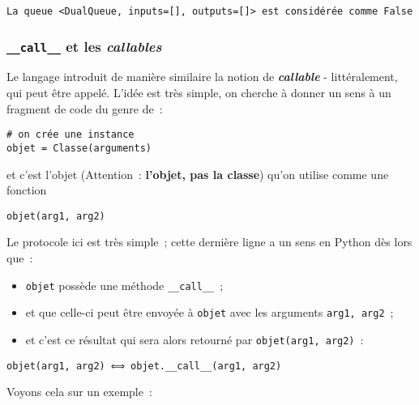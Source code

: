     \begin{Verbatim}[commandchars=\\\{\}]
La queue <DualQueue, inputs=[], outputs=[]> est considérée comme False

    \end{Verbatim}


    \hypertarget{call__-et-les-callables}{%
\subsubsection{\texorpdfstring{\texttt{\_\_call\_\_} et les
\emph{callables}}{\_\_call\_\_ et les callables}}\label{call__-et-les-callables}}

    Le langage introduit de manière similaire la notion de
\textbf{\emph{callable}} - littéralement, qui peut être appelé. L'idée
est très simple, on cherche à donner un sens à un fragment de code du
genre de~:

    \begin{verbatim}
# on crée une instance
objet = Classe(arguments)
\end{verbatim}

et c'est l'objet (Attention~: \textbf{l'objet, pas la classe}) qu'on
utilise comme une fonction

\begin{verbatim}
objet(arg1, arg2)
\end{verbatim}

    Le protocole ici est très simple~; cette dernière ligne a un sens en
Python dès lors que~:

\begin{itemize}
\tightlist
\item
  \texttt{objet} possède une méthode \texttt{\_\_call\_\_}~;
\item
  et que celle-ci peut être envoyée à \texttt{objet} avec les arguments
  \texttt{arg1,\ arg2}~;
\item
  et c'est ce résultat qui sera alors retourné par
  \texttt{objet(arg1,\ arg2)}~:
\end{itemize}

    \begin{verbatim}
objet(arg1, arg2) ⟺ objet.__call__(arg1, arg2)
\end{verbatim}

    Voyons cela sur un exemple~:

